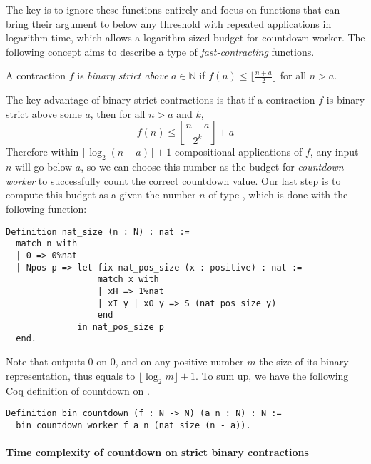 The key is to ignore these functions entirely and focus on functions that can bring their argument to below any threshold with repeated applications in logarithm time, which allows a logarithm-sized budget for countdown worker. The following concept aims to describe a type of \emph{fast-contracting} functions.
\begin{defn} \label{defn: bin-contraction}
	A contraction $f$ is \emph{binary strict above} $a\in \mathbb{N}$ if $f(n) \le \lfloor \frac{n + a}{2} \rfloor$ for all $n > a$.
\end{defn}
The key advantage of binary strict contractions is that if a contraction $f$ is binary strict above some $a$, then for all $n > a$ and $k$,
\begin{equation*}
f(n) \le \left\lfloor \frac{n - a}{2^k} \right\rfloor + a
\end{equation*}
Therefore within $\lfloor \log_2 (n - a) \rfloor + 1$ compositional applications of $f$, any input $n$ will go below $a$, so we can choose this number as the budget for \emph{countdown worker} to successfully count the correct countdown value. Our last step is to compute this budget as a  given the number $n$ of type , which is done with the following function:

\begin{lstlisting}
Definition nat_size (n : N) : nat :=
  match n with
  | 0 => 0%nat
  | Npos p => let fix nat_pos_size (x : positive) : nat :=
                  match x with
                  | xH => 1%nat
                  | xI y | xO y => S (nat_pos_size y) 
                  end
              in nat_pos_size p
  end.
\end{lstlisting}
Note that  outputs $0$ on $0$, and on any positive number $m$ the size of its binary representation, thus equals to $\lfloor \log_{2} m \rfloor + 1$. To sum up, we have the following Coq definition of countdown on .

\begin{lstlisting}
Definition bin_countdown (f : N -> N) (a n : N) : N := 
  bin_countdown_worker f a n (nat_size (n - a)).
\end{lstlisting}

\paragraph*{Time complexity of countdown on strict binary contractions}

